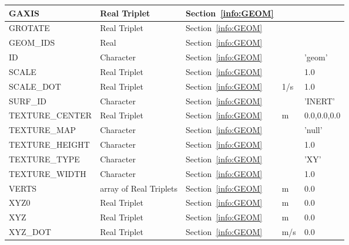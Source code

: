\documentclass[12pt]{article}
\begin{document}
\begin{longtable}{@{\extracolsep{\fill}}|l|l|l|l|l|}
{\ct GAXIS}        & Real Triplet           & Section~\ref{info:GEOM}            &           &                          \\ \hline
{\ct GROTATE}      & Real Triplet           & Section~\ref{info:GEOM}            &           &                          \\ \hline
{\ct GEOM\_IDS}    & Real                   & Section~\ref{info:GEOM}            &           &                          \\ \hline
{\ct ID}           & Character              & Section~\ref{info:GEOM}            &           &   {\ct 'geom'}           \\ \hline
{\ct SCALE}        & Real Triplet           & Section~\ref{info:GEOM}            &           &   1.0                    \\ \hline
{\ct SCALE\_DOT}   & Real Triplet           & Section~\ref{info:GEOM}            &  1/s      &   1.0                    \\ \hline
{\ct SURF\_ID}     & Character              & Section~\ref{info:GEOM}            &           &  {\ct 'INERT'}           \\ \hline
{\ct TEXTURE\_CENTER} & Real Triplet        & Section~\ref{info:GEOM}            &   m       &   0.0,0.0,0.0            \\ \hline
{\ct TEXTURE\_MAP} & Character              & Section~\ref{info:GEOM}            &           &  {\ct 'null'}            \\ \hline
{\ct TEXTURE\_HEIGHT} & Character              & Section~\ref{info:GEOM}            &           & 1.0                   \\ \hline
{\ct TEXTURE\_TYPE}   & Character              & Section~\ref{info:GEOM}            &           & {\ct 'XY'}            \\ \hline
{\ct TEXTURE\_WIDTH} & Character              & Section~\ref{info:GEOM}            &           & 1.0                    \\ \hline
{\ct VERTS}        & array of Real Triplets & Section~\ref{info:GEOM}            &   m       &   0.0                    \\ \hline
{\ct XYZ0}         & Real Triplet           & Section~\ref{info:GEOM}            &   m       &   0.0                    \\ \hline
{\ct XYZ}          & Real Triplet           & Section~\ref{info:GEOM}            &   m       &   0.0                    \\ \hline
{\ct XYZ\_DOT}     & Real Triplet           & Section~\ref{info:GEOM}            &   m/s     &   0.0                    \\ \hline

\end{longtable}
\end{document}
